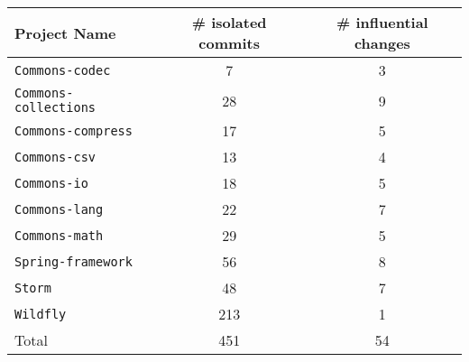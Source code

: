 \centering
\resizebox{0.8\linewidth}{!}
{
\begin{tabular}{lcc}
    Project Name & \# isolated commits & \# influential changes\\
\toprule

{\tt Commons-codec} & 7 & 3 \\
{\tt Commons-collections} & 28 & 9 \\
{\tt Commons-compress} & 17 & 5 \\
{\tt Commons-csv} & 13 & 4 \\
{\tt Commons-io} & 18 & 5 \\
{\tt Commons-lang} & 22 & 7 \\
{\tt Commons-math} & 29 & 5 \\
{\tt Spring-framework} & 56 & 8 \\
{\tt Storm} & 48 & 7 \\
{\tt Wildfly} & 213 & 1 \\
\midrule
Total & 451 & 54 \\
\bottomrule

\end{tabular}
}
